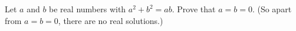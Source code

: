 Let $a$ and $b$ be real numbers with $a^2+b^2=ab$. Prove that $a=b=0$. (So apart from $a=b=0$, there are no real solutions.)
